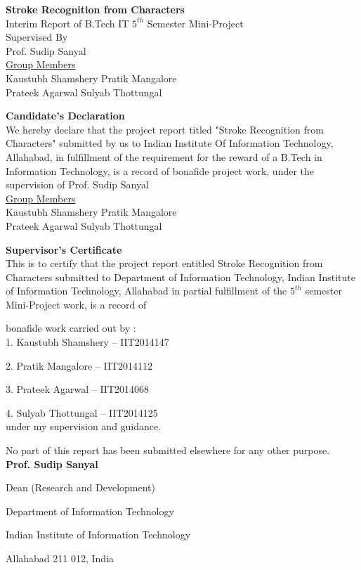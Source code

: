 \documentclass[10pt]{article}
\begin{document}
	\newpage
	\begin{center}
		\Huge \textbf{Stroke Recognition from Characters}
		\\[180pt]
		\Large Interim Report of B.Tech IT $5^{th}$ Semester Mini-Project
		\\[100pt]
		\Large Supervised By\\Prof. Sudip Sanyal
		\\[100pt]
		\underline{Group Members}
		\\[20pt]
		Kaustubh Shamshery \hspace{40pt} Pratik Mangalore\\Prateek Agarwal \hspace{60pt}Sulyab Thottungal     
	\end{center}
	\large
	\newpage
	\begin{center}
		\Huge \textbf{Candidate's Declaration}
		\\[120pt]
		\Large
		We hereby declare that the project report titled "Stroke Recognition from Characters" submitted by us to Indian Institute Of Information Technology, Allahabad, in fulfillment of the requirement for the reward of a B.Tech in Information Technology, is a record of bonafide project work, under the supervision of Prof. Sudip Sanyal
		\\[100pt]
		\underline{Group Members}
		\\[50pt]
		Kaustubh Shamshery \hspace{40pt} Pratik Mangalore\\[50pt] Prateek Agarwal \hspace{60pt}Sulyab Thottungal
	\end{center}
	\newpage
	\begin{center}
		\Huge \textbf{Supervisor's Certificate}
		\\[100pt]
		\Large
		This is to certify that the project report entitled Stroke Recognition from Characters	submitted to Department of Information Technology, Indian Institute of Information	Technology, Allahabad in partial fulfillment of the $5^{th}$ semester Mini-Project work, is a record of
		
		bonafide work carried out by :
		\\[30pt]
		1. Kaustubh Shamshery – IIT2014147
		
		2. Pratik Mangalore – IIT2014112
		
		3. Prateek Agarwal – IIT2014068
		
		4. Sulyab Thottungal – IIT2014125
		\\[30pt]
		under my supervision and guidance.
		
		No part of this report has been submitted elsewhere for any other purpose.
		\\[100pt]
		\flushright
		\textbf{Prof. Sudip Sanyal}
		
		Dean (Research and Development)
		
		Department of Information Technology
		
		Indian Institute of Information Technology
		
		Allahabad 211 012, India
	\end{center}
	\newpage
	\hrulefill
	\tableofcontents
	\hrulefill
	\newpage
	\large
\end{document}
